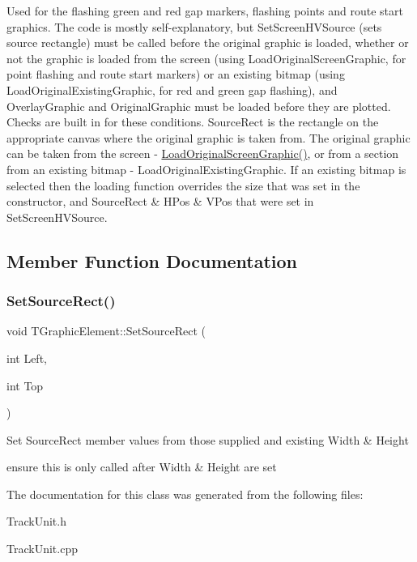 Used for the flashing green and red gap markers, flashing points and route start graphics. The code is mostly self-\/explanatory, but Set\+Screen\+H\+V\+Source (sets source rectangle) must be called before the original graphic is loaded, whether or not the graphic is loaded from the screen (using Load\+Original\+Screen\+Graphic, for point flashing and route start markers) or an existing bitmap (using Load\+Original\+Existing\+Graphic, for red and green gap flashing), and Overlay\+Graphic and Original\+Graphic must be loaded before they are plotted. Checks are built in for these conditions. Source\+Rect is the rectangle on the appropriate canvas where the original graphic is taken from. The original graphic can be taken from the screen -\/ \mbox{\hyperlink{class_t_graphic_element_ac12f60cb52eefdc86eaa504419eb138d}{Load\+Original\+Screen\+Graphic()}}, or from a section from an existing bitmap -\/ Load\+Original\+Existing\+Graphic. If an existing bitmap is selected then the loading function overrides the size that was set in the constructor, and Source\+Rect \& H\+Pos \& V\+Pos that were set in Set\+Screen\+H\+V\+Source. 

\subsection{Member Function Documentation}
\mbox{\label{class_t_graphic_element_adffdc9f9c4a5fff5cbeab6b5a027dad9}} 
\subsubsection{\texorpdfstring{Set\+Source\+Rect()}{SetSourceRect()}}
{\footnotesize\ttfamily void T\+Graphic\+Element\+::\+Set\+Source\+Rect (\begin{DoxyParamCaption}\item[{int}]{Left,  }\item[{int}]{Top }\end{DoxyParamCaption})\hspace{0.3cm}{\ttfamily [inline]}}

Set Source\+Rect member values from those supplied and existing Width \& Height


\begin{DoxyItemize}
\item ensure this is only called after Width \& Height are set 
\end{DoxyItemize}

The documentation for this class was generated from the following files\+:\begin{DoxyCompactItemize}
\item 
Track\+Unit.\+h\item 
Track\+Unit.\+cpp\end{DoxyCompactItemize}
